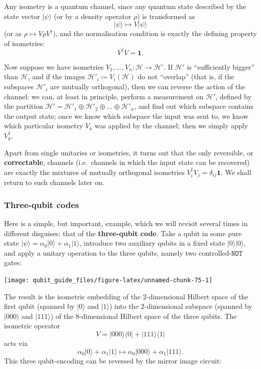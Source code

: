 \documentclass[fleqn,a4paper]{article}
\theoremstyle{definition}
\theoremstyle{definition}
\theoremstyle{definition}
\theoremstyle{definition}
\theoremstyle{remark}
\begin{document}
Any isometry is a quantum channel, since any quantum state described by the state vector \(|\psi\rangle\) (or by a density operator \(\rho\)) is transformed as
\[
  |\psi\rangle\longmapsto V|\psi\rangle
\]
(or as \(\rho\mapsto V\rho V^\dagger\)), and the normalisation condition is exactly the defining property of isometries:
\[
  V^\dagger V =\mathbf{1}.
\]

Now suppose we have isometries \(V_1,\ldots,V_n\colon\mathcal{H}\to\mathcal{H}'\).
If \(\mathcal{H}'\) is ``sufficiently bigger'' than \(\mathcal{H}\), and if the images \(\mathcal{H}'_i\coloneqq V_i(\mathcal{H})\) do not ``overlap'' (that is, if the subspaces \(\mathcal{H}'_i\) are mutually orthogonal), then we can reverse the action of the channel:
we can, at least in principle, perform a measurement on \(\mathcal{H}'\), defined by the partition \(\mathcal{H}'=\mathcal{H}'_1\oplus\mathcal{H}'_2\oplus\ldots\oplus\mathcal{H}'_n\), and find out which subspace contains the output state;
once we know which subspace the input was sent to, we know which particular isometry \(V_k\) was applied by the channel;
then we simply apply \(V^\dagger_k\).

Apart from single unitaries or isometries, it turns out that the only reversible, or \textbf{correctable}, channels (i.e.~channels in which the input state can be recovered) are exactly the mixtures of mutually orthogonal isometries \(V^\dagger_i V_j=\delta_{ij}\mathbf{1}\).
We shall return to such channels later on.

\hypertarget{three-qubit-codes}{%
\subsubsection{Three-qubit codes}\label{three-qubit-codes}}

Here is a simple, but important, example, which we will revisit several times in different disguises: that of the \textbf{three-qubit code}.
Take a qubit in some pure state \(|\psi\rangle=\alpha_0|0\rangle+\alpha_1|1\rangle\), introduce two auxiliary qubits in a fixed state \(|0\rangle|0\rangle\), and apply a unitary operation to the three qubits, namely two controlled-\(\texttt{NOT}\) gates:

\begin{center}\texttt{[image: qubit\_guide\_files/figure-latex/unnamed-chunk-75-1]} \end{center}

The result is the isometric embedding of the \(2\)-dimensional Hilbert space of the first qubit (spanned by \(|0\rangle\) and \(|1\rangle\)) into the \(2\)-dimensional subspace (spanned by \(|000\rangle\) and \(|111\rangle\)) of the \(8\)-dimensional Hilbert space of the three qubits.
The isometric operator
\[
  V = |000\rangle\langle 0| + |111\rangle\langle 1|
\]
acts via
\[
  \alpha_0|0\rangle+\alpha_1|1\rangle
  \longmapsto \alpha_0|000\rangle+\alpha_1|111\rangle.
\]
This three qubit-encoding can be reversed by the mirror image circuit:
\end{document}
